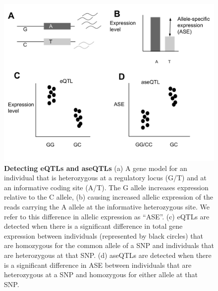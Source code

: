 \begin{figure}[!ht]
      \centering
       \includegraphics[width=\linewidth]{Ch3Fig1}
    \caption{\textbf{Detecting eQTLs and aseQTLs} (a) A gene model for an individual that is heterozygous at a regulatory locus (G/T) and at an informative coding site (A/T). The G allele increases expression relative to the C allele, (b) causing increased allelic expression of the reads carrying the A allele at the informative heterozygous site. We refer to this difference in allelic expression as “ASE”. (c) eQTLs are detected when there is a significant difference in total gene expression between individuals (represented by black circles) that are homozygous for the common allele of a SNP and individuals that are heterozygous at that SNP. (d) aseQTLs are detected when there is a significant difference in ASE between individuals that are heterozygous at a SNP and homozygous for either allele at that SNP.}
    \label{fig:3fig1}
\end{figure}



